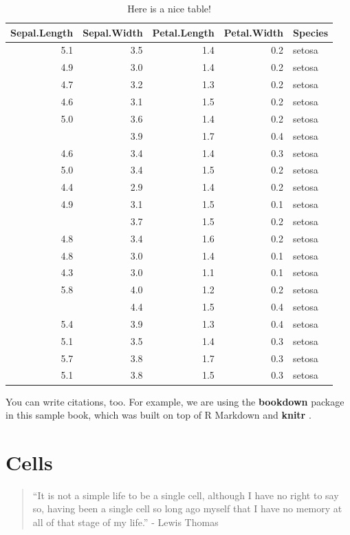 \documentclass[]{tufte-book}
\begin{document}
\begin{table}

\caption{\label{tab:nice-tab}Here is a nice table!}
\centering
\begin{tabular}[t]{rrrrl}
\toprule
Sepal.Length & Sepal.Width & Petal.Length & Petal.Width & Species\\
\midrule
5.1 & 3.5 & 1.4 & 0.2 & setosa\\
4.9 & 3.0 & 1.4 & 0.2 & setosa\\
4.7 & 3.2 & 1.3 & 0.2 & setosa\\
4.6 & 3.1 & 1.5 & 0.2 & setosa\\
5.0 & 3.6 & 1.4 & 0.2 & setosa\\
\addlinespace
5.4 & 3.9 & 1.7 & 0.4 & setosa\\
4.6 & 3.4 & 1.4 & 0.3 & setosa\\
5.0 & 3.4 & 1.5 & 0.2 & setosa\\
4.4 & 2.9 & 1.4 & 0.2 & setosa\\
4.9 & 3.1 & 1.5 & 0.1 & setosa\\
\addlinespace
5.4 & 3.7 & 1.5 & 0.2 & setosa\\
4.8 & 3.4 & 1.6 & 0.2 & setosa\\
4.8 & 3.0 & 1.4 & 0.1 & setosa\\
4.3 & 3.0 & 1.1 & 0.1 & setosa\\
5.8 & 4.0 & 1.2 & 0.2 & setosa\\
\addlinespace
5.7 & 4.4 & 1.5 & 0.4 & setosa\\
5.4 & 3.9 & 1.3 & 0.4 & setosa\\
5.1 & 3.5 & 1.4 & 0.3 & setosa\\
5.7 & 3.8 & 1.7 & 0.3 & setosa\\
5.1 & 3.8 & 1.5 & 0.3 & setosa\\
\bottomrule
\end{tabular}
\end{table}

You can write citations, too. For example, we are using the
\textbf{bookdown} package \citep{R-bookdown} in this sample book, which
was built on top of R Markdown and \textbf{knitr} \citep{xie2015}.

\chapter{Cells}\label{cells}

\begin{quote}
``It is not a simple life to be a single cell, although I have no right
to say so, having been a single cell so long ago myself that I have no
memory at all of that stage of my life.'' - Lewis Thomas
\citep{thomas1990}
\end{quote}
\end{document}

